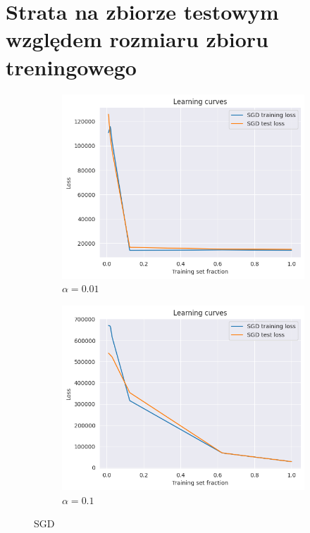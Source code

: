 \documentclass[a4paper,12pt]{article}
\begin{document}
\section{Strata na zbiorze testowym względem rozmiaru zbioru treningowego}
\begin{figure}[h!]
    \centering
    \begin{subfigure}[b]{0.45\textwidth}
        \includegraphics[width=\textwidth]{sgd_fast.png}
        \caption{$\alpha=0.01$}
    \end{subfigure}
    \hfill
    \begin{subfigure}[b]{0.45\textwidth}
        \includegraphics[width=\textwidth]{sgd_slow.png}
        \caption{$\alpha=0.1$}
    \end{subfigure}
    \caption{SGD}
\end{figure}
\end{document}
